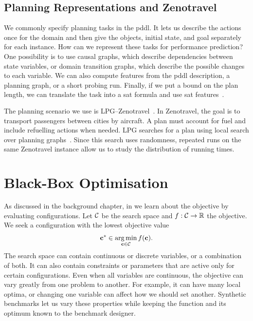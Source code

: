 \subsection{Planning Representations and Zenotravel}

We commonly specify planning tasks in the \Gls{pddl}. It lets us describe the actions once for the domain and then give the objects, initial state, and goal separately for each instance. How can we represent these tasks for performance prediction? One possibility is to use causal graphs, which describe dependencies between state variables, or domain transition graphs, which describe the possible changes to each variable. We can also compute features from the \gls{pddl} description, a planning graph, or a short probing run. Finally, if we put a bound on the plan length, we can translate the task into a \gls{sat} formula and use \gls{sat} features~\citep{KauSel96,FawEtAl14}.

The planning scenario we use is LPG--Zenotravel~\citep{EggEtAl18}. In Zenotravel, the goal is to transport passengers between cities by aircraft. A plan must account for fuel and include refuelling actions when needed. LPG searches for a plan using local search over planning graphs~\citep{GerSer02}. Since this search uses randomness, repeated runs on the same Zenotravel instance allow us to study the distribution of running times.

\section{Black-Box Optimisation}
\label{sec:ch03:bbo}

As discussed in the background chapter, in  we learn about the objective by evaluating configurations. Let $\mathcal{C}$ be the search space and $f:\mathcal{C}\rightarrow\mathbb R$ the objective. We seek a configuration with the lowest objective value
\begin{equation*}
    \mathbf{c}^* \in \operatorname*{arg\,min}_{\mathbf{c}\in\mathcal{C}}
    f(\mathbf{c}).
\end{equation*}
The search space can contain continuous or discrete variables, or a combination of both. It can also contain constraints or parameters that are active only for certain configurations. Even when all variables are continuous, the objective can vary greatly from one problem to another. For example, it can have many local optima, or changing one variable can affect how we should set another. Synthetic benchmarks let us vary these properties while keeping the function and its optimum known to the benchmark designer.

